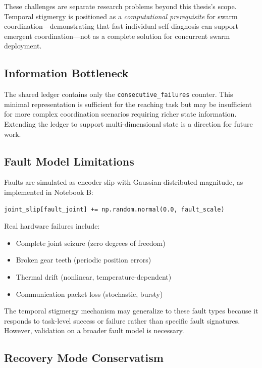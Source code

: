 \documentclass[12pt,a4paper,oneside]{report}
\begin{document}
These challenges are separate research problems beyond this thesis's scope. Temporal stigmergy is positioned as a \textit{computational prerequisite} for swarm coordination—demonstrating that fast individual self-diagnosis can support emergent coordination—not as a complete solution for concurrent swarm deployment.

\subsection{Information Bottleneck}

The shared ledger contains only the \texttt{consecutive\_failures} counter. This minimal representation is sufficient for the reaching task but may be insufficient for more complex coordination scenarios requiring richer state information. Extending the ledger to support multi-dimensional state is a direction for future work.

\subsection{Fault Model Limitations}

Faults are simulated as encoder slip with Gaussian-distributed magnitude, as implemented in Notebook B:

\begin{verbatim}
joint_slip[fault_joint] += np.random.normal(0.0, fault_scale)
\end{verbatim}

Real hardware failures include:
\begin{itemize}
    \item Complete joint seizure (zero degrees of freedom)
    \item Broken gear teeth (periodic position errors)
    \item Thermal drift (nonlinear, temperature-dependent)
    \item Communication packet loss (stochastic, bursty)
\end{itemize}

The temporal stigmergy mechanism may generalize to these fault types because it responds to task-level success or failure rather than specific fault signatures. However, validation on a broader fault model is necessary.

\subsection{Recovery Mode Conservatism}
\end{document}
